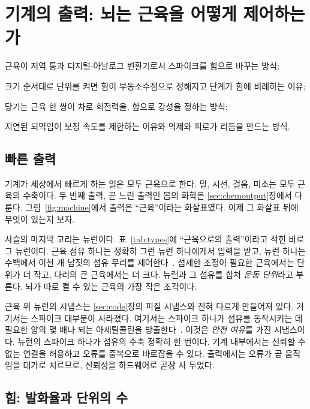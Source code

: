 \chapter{기계의 출력: 뇌는 근육을 어떻게 제어하는가}
\label{sec:muscles}
\begin{chaptergoals}
\item 근육이 저역 통과 디지털-아날로그 변환기로서 스파이크를 힘으로 바꾸는 방식;
\item 크기 순서대로 단위를 켜면 힘이 부동소수점으로 정해지고 단계가 힘에 비례하는 이유;
\item 당기는 근육 한 쌍이 차로 회전력을, 합으로 강성을 정하는 방식;
\item 지연된 되먹임이 보정 속도를 제한하는 이유와 억제와 피로가 리듬을 만드는 방식.
\end{chaptergoals}

\section{빠른 출력}

기계가 세상에서 빠르게 하는 일은 모두 근육으로 한다. 말, 시선, 걸음, 미소는 모두 근육의 수축이다. 두 번째 출력, 곧 느린 출력인 몸의 화학은 \ref{sec:chemoutput}장에서 다룬다. 그림~\ref{fig:machine}에서 출력은 “근육”이라는 화살표였다. 이제 그 화살표 뒤에 무엇이 있는지 보자.

사슬의 마지막 고리는  뉴런이다. 표~\ref{tab:types}에 “근육으로의 출력”이라고 적힌 바로 그 뉴런이다. 근육 섬유 하나는 정확히 그런 뉴런 하나에게서 입력을 받고, 뉴런 하나는 수백에서 이천 개 남짓의 섬유 무리를 제어한다~\cite{Feinstein1955mu}. 섬세한 조정이 필요한 근육에서는 단위가 더 작고, 다리의 큰 근육에서는 더 크다. 뉴런과 그 섬유를 합쳐 \emph{운동 단위}라고 부른다. 뇌가 따로 켤 수 있는 근육의 가장 작은 조각이다.

근육 위 뉴런의 시냅스는 \ref{sec:code}장의 피질 시냅스와 전혀 다르게 만들어져 있다. 거기서는 스파이크 대부분이 사라졌다. 여기서는 스파이크 하나가 섬유를 동작시키는 데 필요한 양의 몇 배나 되는 아세틸콜린을 방출한다~\cite{WoodSlater2001}. 이것은 \emph{안전 여유}를 가진 시냅스이다. 뉴런의 스파이크 하나가 섬유의 수축 정확히 한 번이다. 기계 내부에서는 신뢰할 수 없는 연결을 허용하고 오류를 중복으로 바로잡을 수 있다. 출력에서는 오류가 곧 움직임을 대가로 치르므로, 신뢰성을 하드웨어로 곧장 사 두었다.

\section{힘: 발화율과 단위의 수}

